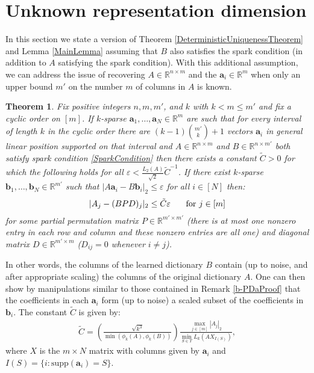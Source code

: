 \documentclass[journal, twocolumn]{IEEEtran}
\newtheorem{theorem}{Theorem}
\begin{document}
\section{Unknown representation dimension}\label{mleqm}

In this section we state a version of Theorem \ref{DeterministicUniquenessTheorem} and Lemma \ref{MainLemma} assuming that $B$ also satisfies the spark condition (in addition to $A$ satisfying the spark condition). With this additional assumption, we can address the issue of recovering $A \in \mathbb{R}^{n \times m}$ and the $\mathbf{a}_i \in \mathbb{R}^m$ when only an upper bound $m'$ on the number $m$ of columns in $A$ is known. 
\begin{theorem}\label{DeterministicUniquenessTheorem2}
Fix positive integers $n, m, m'$, and $k$ with $k < m \leq m'$ and fix a cyclic order on $[m]$. If $k$-sparse $\mathbf{a}_1, \ldots, \mathbf{a}_N \in \mathbb{R}^m$ are such that for every interval of length $k$ in the cyclic order there are $(k-1){m' \choose k}+1$ vectors $\mathbf{a}_i$ in general linear position supported on that interval and $A \in \mathbb{R}^{n \times m}$ and $B \in \mathbb{R}^{n \times m'}$ both satisfy spark condition \eqref{SparkCondition} then there exists a constant $\tilde C > 0$ for which the following holds for all $\varepsilon < \frac{L_2(A)}{\sqrt{2}} \tilde C^{-1}$. If there exist $k$-sparse $\mathbf{b}_1, \ldots, \mathbf{b}_N \in \mathbb{R}^{m'}$ such that $|A\mathbf{a}_i - B\mathbf{b}_i|_2 \leq \varepsilon$ for all $i \in [N]$ then:
\begin{align}
|A_j-(BPD)_j|_2 \leq \tilde C\varepsilon \indent \text{ for } j \in [m]
\end{align}
%
for some partial permutation matrix $P \in \mathbb{R}^{m' \times m'}$ (there is at most one nonzero entry in each row and column and these nonzero entries are all one) and diagonal matrix $D \in \mathbb{R}^{m' \times m}$ ($D_{ij} = 0$ whenever $i \neq j$). 
\end{theorem}

In other words, the columns of the learned dictionary $B$ contain (up to noise, and after appropriate scaling) the columns of the original dictionary $A$. One can then show by manipulations similar to those contained in Remark \ref{b-PDaProof} that the coefficients in each $\mathbf{a}_i$ form (up to noise) a scaled subset of the coefficients in $\mathbf{b}_i$. The constant $\tilde C$ is given by:
\begin{align}\label{Cdef'}
\tilde C= \left( \frac{ \sqrt{k^3}}{ \min(\phi_k(A), \phi_k(B)) } \right) \frac{\max_{j \in [m]} |A_j|_2}{\min_{S \in T} L_k(AX_{I(S)})},
\end{align}
%
where $X$ is the $m \times N$ matrix with columns given by $\mathbf{a}_i$ and $I(S) = \{i : \text{supp}(\mathbf{a}_i) = S\}$.
\end{document}
